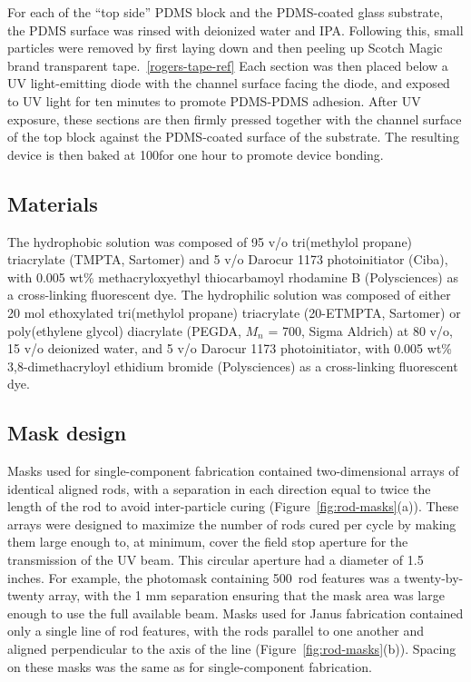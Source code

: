 For each of the ``top side'' PDMS block and the PDMS-coated glass substrate, the PDMS surface was rinsed with 
deionized water and IPA.  Following this, small particles were removed by first laying down and then peeling up
Scotch Magic brand transparent tape.~\ref{rogers-tape-ref}  Each section was then placed below a UV light-emitting
diode with the channel surface facing the diode, and exposed to UV light for ten minutes to promote PDMS-PDMS
adhesion.  After UV exposure, these sections are then firmly pressed together with the channel surface of the top
block against the PDMS-coated surface of the substrate.  The resulting device is then baked at 100\degC for one hour
to promote device bonding.

\subsection{Materials}
The hydrophobic solution was composed of 95 v/o 
tri(methylol propane) triacrylate (TMPTA, Sartomer) and 5 v/o Darocur 1173 photoinitiator (Ciba), 
with 0.005 wt\% methacryloxyethyl thiocarbamoyl rhodamine B (Polysciences) as a cross-linking 
fluorescent dye.
The hydrophilic solution was composed of either 20 mol ethoxylated tri(methylol propane) triacrylate (20-ETMPTA,
Sartomer) or poly(ethylene glycol) diacrylate (PEGDA, $M_n$ = 700, Sigma Aldrich) at 80 v/o, 
15 v/o deionized water, and 5 v/o Darocur 1173 photoinitiator, with 0.005 wt\% 
3,8-dimethacryloyl ethidium bromide (Polysciences) as a cross-linking fluorescent dye.


\subsection{Mask design}
Masks used for single-component fabrication contained two-dimensional arrays of identical aligned 
rods, with a separation in each direction equal to twice the length of the rod to avoid inter-particle
curing (Figure~\ref{fig:rod-masks}(a)). These arrays were designed to maximize the number of 
rods cured per cycle by making them large enough to, at minimum,
cover the field stop aperture for the transmission of the UV beam. This circular aperture 
had a diameter of 1.5 inches.  For example, the photomask containing 500~\microns rod features
was a twenty-by-twenty array, with the 1 mm separation ensuring that the mask area was large enough to
use the full available beam.  
Masks used for Janus fabrication contained only a single line of rod features, with the rods parallel to one 
another and aligned perpendicular to the axis of the line (Figure~\ref{fig:rod-masks}(b)).  Spacing on these 
masks was the same as for single-component fabrication.


